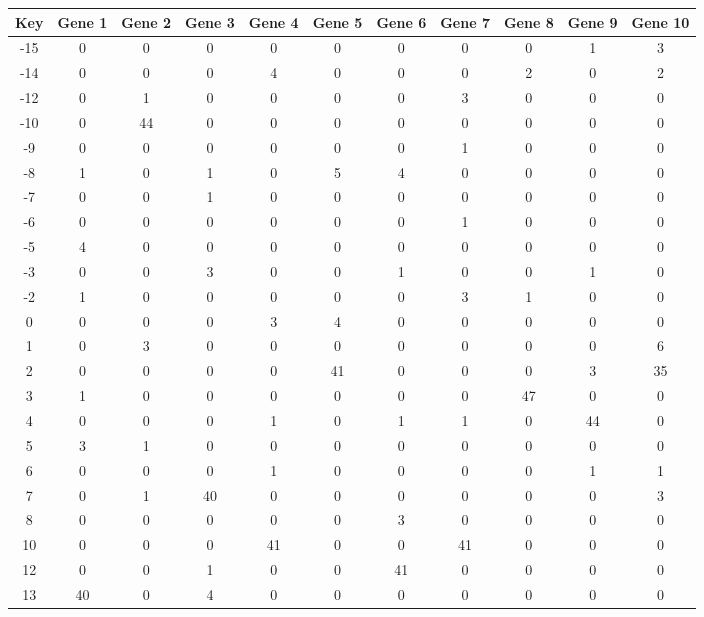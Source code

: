 \begin{tabular}{|c|c|c|c|c|c|c|c|c|c|c|}
\hline
Key & Gene 1 & Gene 2 & Gene 3 & Gene 4 & Gene 5 & Gene 6 & Gene 7 & Gene 8 & Gene 9 & Gene 10 \\
\hline
-15 & 0 & 0 & 0 & 0 & 0 & 0 & 0 & 0 & 1 & 3 \\
-14 & 0 & 0 & 0 & 4 & 0 & 0 & 0 & 2 & 0 & 2 \\
-12 & 0 & 1 & 0 & 0 & 0 & 0 & 3 & 0 & 0 & 0 \\
-10 & 0 & 44 & 0 & 0 & 0 & 0 & 0 & 0 & 0 & 0 \\
-9 & 0 & 0 & 0 & 0 & 0 & 0 & 1 & 0 & 0 & 0 \\
-8 & 1 & 0 & 1 & 0 & 5 & 4 & 0 & 0 & 0 & 0 \\
-7 & 0 & 0 & 1 & 0 & 0 & 0 & 0 & 0 & 0 & 0 \\
-6 & 0 & 0 & 0 & 0 & 0 & 0 & 1 & 0 & 0 & 0 \\
-5 & 4 & 0 & 0 & 0 & 0 & 0 & 0 & 0 & 0 & 0 \\
-3 & 0 & 0 & 3 & 0 & 0 & 1 & 0 & 0 & 1 & 0 \\
-2 & 1 & 0 & 0 & 0 & 0 & 0 & 3 & 1 & 0 & 0 \\
0 & 0 & 0 & 0 & 3 & 4 & 0 & 0 & 0 & 0 & 0 \\
1 & 0 & 3 & 0 & 0 & 0 & 0 & 0 & 0 & 0 & 6 \\
2 & 0 & 0 & 0 & 0 & 41 & 0 & 0 & 0 & 3 & 35 \\
3 & 1 & 0 & 0 & 0 & 0 & 0 & 0 & 47 & 0 & 0 \\
4 & 0 & 0 & 0 & 1 & 0 & 1 & 1 & 0 & 44 & 0 \\
5 & 3 & 1 & 0 & 0 & 0 & 0 & 0 & 0 & 0 & 0 \\
6 & 0 & 0 & 0 & 1 & 0 & 0 & 0 & 0 & 1 & 1 \\
7 & 0 & 1 & 40 & 0 & 0 & 0 & 0 & 0 & 0 & 3 \\
8 & 0 & 0 & 0 & 0 & 0 & 3 & 0 & 0 & 0 & 0 \\
10 & 0 & 0 & 0 & 41 & 0 & 0 & 41 & 0 & 0 & 0 \\
12 & 0 & 0 & 1 & 0 & 0 & 41 & 0 & 0 & 0 & 0 \\
13 & 40 & 0 & 4 & 0 & 0 & 0 & 0 & 0 & 0 & 0 \\
\hline
\end{tabular}